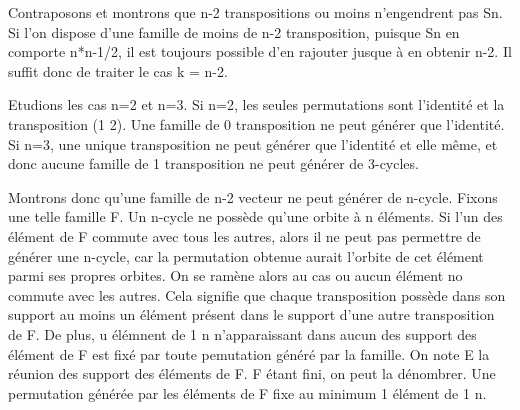 \documentclass[a4paper]{article}
\begin{document}
\pagestyle{fancy}

Contraposons et montrons que n-2 transpositions ou moins n'engendrent pas Sn. Si l'on dispose d'une famille de moins de n-2 transposition, puisque Sn en comporte n*n-1/2, il est toujours possible d'en rajouter jusque à en obtenir n-2. Il suffit donc de traiter le cas k = n-2.   

Etudions les cas n=2 et n=3.
Si n=2, les seules permutations sont l'identité et la transposition (1 2). Une famille de 0 transposition ne peut générer que l'identité. 
Si n=3, une unique transposition ne peut générer que l'identité et elle même, et donc aucune famille de 1 transposition ne peut générer de 3-cycles.  

Montrons donc qu'une famille de n-2 vecteur ne peut générer de n-cycle. Fixons une telle famille F. Un n-cycle ne possède qu'une orbite à n éléments. Si l'un des élément de F commute avec tous les autres, alors il ne peut pas permettre de générer une n-cycle, car la permutation obtenue aurait l'orbite de cet élément parmi ses propres orbites. On se ramène alors au cas ou aucun élément no commute avec les autres. Cela signifie que chaque transposition possède dans son support au moins un élément présent dans le support d'une autre transposition de F. De plus, u élémnent de 1 n n'apparaissant dans aucun des support des élément de F est fixé par toute pemutation généré par la famille. On note E la réunion des support des éléments de F. F étant fini, on peut la dénombrer.  Une permutation générée par les éléments de F fixe au minimum 1 élément de 1 n. 
\end{document}
